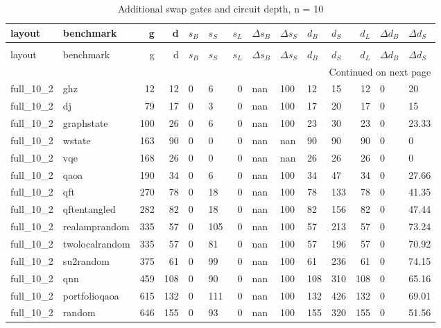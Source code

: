 \begin{longtable}{llrrllrllllrll}
\caption{Additional swap gates and circuit depth, n = 10} \label{benchmark-table-10} \\
\toprule
layout & benchmark & g & d & $s_B$ & $s_S$ & $s_L$ & $\Delta s_B$ & $\Delta s_S$ & $d_B$ & $d_S$ & $d_L$ & $\Delta d_B$ & $\Delta d_S$ \\
\midrule
\endfirsthead
\caption[]{Additional swap gates and circuit depth, n = 10} \\
\toprule
layout & benchmark & g & d & $s_B$ & $s_S$ & $s_L$ & $\Delta s_B$ & $\Delta s_S$ & $d_B$ & $d_S$ & $d_L$ & $\Delta d_B$ & $\Delta d_S$ \\
\midrule
\endhead
\midrule
\multicolumn{14}{r}{Continued on next page} \\
\midrule
\endfoot
\bottomrule
\endlastfoot
full\_10\_2 & ghz & 12 & 12 & 0 & 6 & 0 & nan & 100 & 12 & 15 & 12 & 0 & 20 \\
full\_10\_2 & dj & 79 & 17 & 0 & 3 & 0 & nan & 100 & 17 & 20 & 17 & 0 & 15 \\
full\_10\_2 & graphstate & 100 & 26 & 0 & 6 & 0 & nan & 100 & 23 & 30 & 23 & 0 & 23.33 \\
full\_10\_2 & wstate & 163 & 90 & 0 & 0 & 0 & nan & nan & 90 & 90 & 90 & 0 & 0 \\
full\_10\_2 & vqe & 168 & 26 & 0 & 0 & 0 & nan & nan & 26 & 26 & 26 & 0 & 0 \\
full\_10\_2 & qaoa & 190 & 34 & 0 & 6 & 0 & nan & 100 & 34 & 47 & 34 & 0 & 27.66 \\
full\_10\_2 & qft & 270 & 78 & 0 & 18 & 0 & nan & 100 & 78 & 133 & 78 & 0 & 41.35 \\
full\_10\_2 & qftentangled & 282 & 82 & 0 & 18 & 0 & nan & 100 & 82 & 156 & 82 & 0 & 47.44 \\
full\_10\_2 & realamprandom & 335 & 57 & 0 & 105 & 0 & nan & 100 & 57 & 213 & 57 & 0 & 73.24 \\
full\_10\_2 & twolocalrandom & 335 & 57 & 0 & 81 & 0 & nan & 100 & 57 & 196 & 57 & 0 & 70.92 \\
full\_10\_2 & su2random & 375 & 61 & 0 & 99 & 0 & nan & 100 & 61 & 236 & 61 & 0 & 74.15 \\
full\_10\_2 & qnn & 459 & 108 & 0 & 90 & 0 & nan & 100 & 108 & 310 & 108 & 0 & 65.16 \\
full\_10\_2 & portfolioqaoa & 615 & 132 & 0 & 111 & 0 & nan & 100 & 132 & 426 & 132 & 0 & 69.01 \\
full\_10\_2 & random & 646 & 155 & 0 & 93 & 0 & nan & 100 & 155 & 320 & 155 & 0 & 51.56 \\

\end{longtable}
